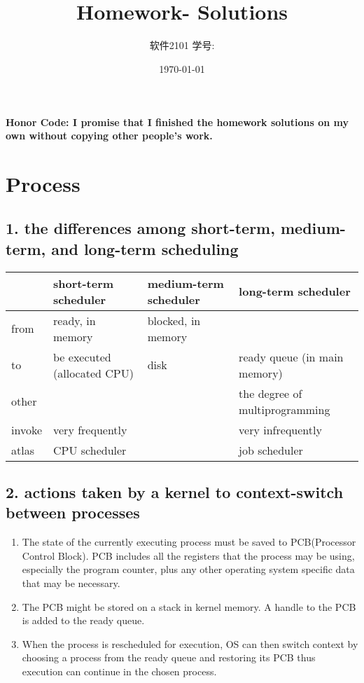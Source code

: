 \documentclass[11pt]{article}
\title{\vspace{-4cm}\CourseCodeName \space
        \Session \protect\\  Homework-\textbf{\Homework} Solutions}
\author{软件2101 \Name \space 学号: \SID}
\date{\today}
\begin{document}
\maketitle

\textbf{Honor Code: I promise that I finished the homework solutions on my own without copying other people's 
    work.}

\section*{Process}

\subsection*{1. the differences among short-term, medium-term, and long-term scheduling}

    \begin{table}[H]
        \begin{tabular}{|l|l|l|l|}
            \hline
                & short-term scheduler        & medium-term scheduler & long-term scheduler            \\ \hline
            from   & ready, in memory            & blocked, in memory    &                                \\ \hline
            to     & be executed (allocated CPU) & disk                  & ready queue (in main memory)   \\ \hline
            other  &                             &                       & the degree of multiprogramming \\ \hline
            invoke & very frequently             &                       & very infrequently              \\ \hline
            atlas  & CPU scheduler               &                       & job scheduler                  \\ \hline
        \end{tabular}
    \end{table}

\subsection*{2. actions taken by a kernel to context-switch between processes}

    \begin{enumerate}
        \item The state of the currently executing process must be saved to PCB(Processor Control Block). PCB includes all the registers 
            that the process may be using, especially the program counter, plus any other operating system specific data 
            that may be necessary.
        \item The PCB might be stored on a stack in kernel memory. A handle to the PCB is added to the ready queue.
        \item When the process is rescheduled for execution, OS can then switch context by choosing a process from the ready queue and 
        restoring its PCB thus execution can continue in the chosen process.
    \end{enumerate}
\end{document}
